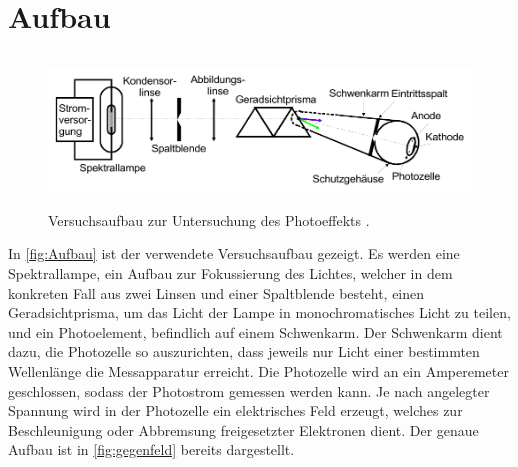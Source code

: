 \section{Aufbau}
\label{sec:Aufbau}

\begin{figure}
    \centering
    \includegraphics[height = 4cm]{Aufbau.pdf}
    \caption{Versuchsaufbau zur Untersuchung des Photoeffekts \cite{ap500}.}
    \label{fig:Aufbau}
\end{figure}
In \autoref{fig:Aufbau} ist der verwendete Versuchsaufbau gezeigt.
Es werden eine Spektrallampe, ein Aufbau zur Fokussierung des Lichtes, welcher in dem konkreten Fall aus zwei Linsen und einer Spaltblende besteht, einen Geradsichtprisma, um das Licht der Lampe in monochromatisches Licht zu teilen, und
ein Photoelement, befindlich auf einem Schwenkarm. Der Schwenkarm dient dazu, die Photozelle so auszurichten, dass jeweils nur Licht einer bestimmten Wellenlänge die Messapparatur erreicht.
Die Photozelle wird an ein Amperemeter geschlossen, sodass der Photostrom gemessen werden kann. 
Je nach angelegter Spannung wird in der Photozelle ein elektrisches Feld erzeugt, welches zur Beschleunigung oder Abbremsung freigesetzter Elektronen dient. Der genaue Aufbau ist in \autoref{fig:gegenfeld} bereits dargestellt. 